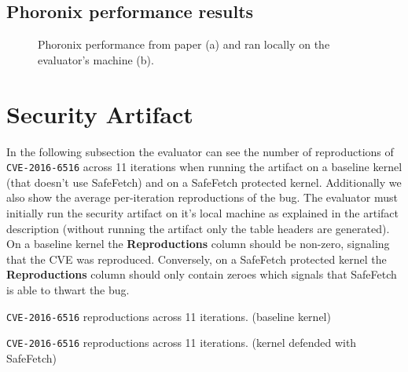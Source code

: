 \subsection{Phoronix performance results}
\begin{figure}[!h]
  \hfill
  \hfill
  \hfill
  \centering
  \caption{Phoronix performance from paper (a) and ran locally on the evaluator's machine (b).}
  \label{fig:phoronixosbench}
  \end{figure}

\newpage
\section{Security Artifact}
In the following subsection the evaluator can see the number of reproductions of \texttt{CVE-2016-6516} 
across 11 iterations when running the artifact on a baseline kernel (that doesn't use SafeFetch) and on a 
SafeFetch protected kernel.
Additionally we also show the average per-iteration reproductions of the bug.
The evaluator must initially run the security artifact on it's local machine as 
explained in the artifact description (without running the artifact only the table headers are generated).
On a baseline kernel the \textbf{Reproductions} column should be non-zero, signaling that the CVE was 
reproduced.
Conversely, on a SafeFetch protected kernel the \textbf{Reproductions} column should only contain zeroes
which signals that SafeFetch is able to thwart the bug.

\begin{table}[!h]
  \caption{\texttt{CVE-2016-6516} reproductions across 11 iterations. (baseline kernel)}
  \begin{center}
  \resizebox{0.25\columnwidth}{!}{%
  
  }
\end{center}
\label{tab:security-baseline-local}
\end{table}
\begin{table}[!h]
  \caption{\texttt{CVE-2016-6516} reproductions across 11 iterations. (kernel defended with SafeFetch)}
  \begin{center}
  \resizebox{0.25\columnwidth}{!}{%
  
  }
\end{center}
\label{tab:security-safefetch-local}
\end{table}





